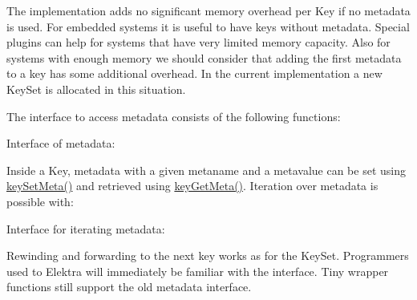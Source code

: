 The implementation adds no significant memory overhead per {\ttfamily Key} if no metadata is used. For embedded systems it is useful to have keys without metadata. Special plugins can help for systems that have very limited memory capacity. Also for systems with enough memory we should consider that adding the first metadata to a key has some additional overhead. In the current implementation a new {\ttfamily Key\+Set} is allocated in this situation.

The interface to access metadata consists of the following functions\+:

Interface of metadata\+:


\begin{DoxyCode}{0}
\end{DoxyCode}


Inside a {\ttfamily Key}, metadata with a given metaname and a metavalue can be set using {\ttfamily \mbox{\hyperlink{group__keymeta_gae1f15546b234ffb6007d8a31178652b9}{key\+Set\+Meta()}}} and retrieved using {\ttfamily \mbox{\hyperlink{group__keymeta_ga9ed3875495ddb3d8a8d29158a60a147c}{key\+Get\+Meta()}}}. Iteration over metadata is possible with\+:

Interface for iterating metadata\+:


\begin{DoxyCode}{0}
\end{DoxyCode}


Rewinding and forwarding to the next key works as for the {\ttfamily Key\+Set}. Programmers used to Elektra will immediately be familiar with the interface. Tiny wrapper functions still support the old metadata interface.

